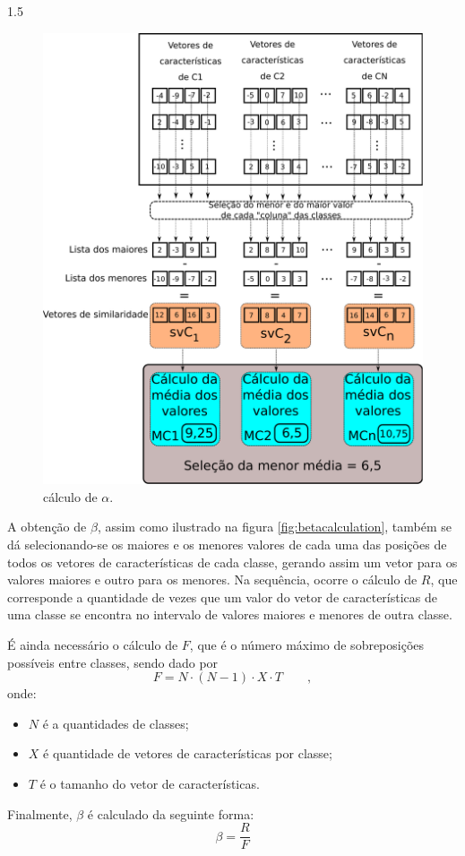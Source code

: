 \documentclass[a4paper,12pt,openright,oneside]{book}
\newenvironment{myenv}[1]
{\begin{spacing}{#1}}
	{\end{spacing}}
\begin{document}
\begin{myenv}{1.5}
\begin{figure}[H]
\centering
\includegraphics[width=0.6\linewidth]{images/calculoAlpha.pdf}
\caption{cálculo de $\alpha$.}
\label{fig:calculoalpha}
\end{figure}
\par A obtenção de $\beta$, assim como ilustrado na figura \ref{fig:betacalculation}, também se dá selecionando-se os maiores e os menores valores de cada uma das posições de todos os vetores de características de cada classe, gerando assim um vetor para os valores maiores e outro para os menores. Na sequência, ocorre o cálculo de $R$, que corresponde a quantidade de vezes que um valor do vetor de características de uma classe se encontra no intervalo de valores maiores e menores de outra classe.
\\
\par É ainda necessário o cálculo de $F$, que é o número máximo de sobreposições possíveis entre classes, sendo dado por
\begin{equation}
F=N \cdot (N-1) \cdot X \cdot T \qquad, 
\end{equation}
onde:
\begin{itemize}
\item $N$ é a quantidades de classes;
\item $X$ é quantidade de vetores de características por classe;
\item $T$ é o tamanho do vetor de características.
\end{itemize}
\par Finalmente, $\beta$ é calculado da seguinte forma:
\begin{equation}
\beta=\dfrac{R}{F}
\end{equation}

\end{myenv}
\end{document}
